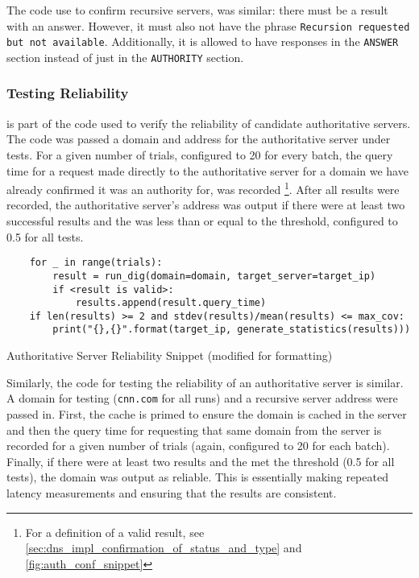 The code use to confirm recursive servers, was similar: there must be a result with an answer. However, it must also not have the phrase \texttt{Recursion requested but not available}. Additionally, it is allowed to have responses in the \texttt{ANSWER} section instead of just in the \texttt{AUTHORITY} section.

\subsubsection{Testing Reliability}

 is part of the code used to verify the reliability of candidate authoritative servers. The code was passed a domain and \ip address for the authoritative server under tests. For a given number of trials, configured to 20 for every batch, the query time for a request made directly to the authoritative server for a domain we have already confirmed it was an authority for, was recorded \footnote{For a definition of a valid result, see \cref{sec:dns_impl_confirmation_of_status_and_type} and \cref{fig:auth_conf_snippet}}. After all results were recorded, the authoritative server's \ip address was output if there were at least two successful results and the \cv was less than or equal to the threshold, configured to 0.5 for all tests.

\begin{code}[htb]
\centering
    \begin{verbatim}
    for _ in range(trials):
        result = run_dig(domain=domain, target_server=target_ip)
        if <result is valid>:
            results.append(result.query_time)
    if len(results) >= 2 and stdev(results)/mean(results) <= max_cov:
        print("{},{}".format(target_ip, generate_statistics(results)))
    \end{verbatim}
    \caption{Authoritative Server Reliability Snippet (modified for formatting)}
    \label{fig:auth_reliability_snippet}
\end{code}

Similarly, the code for testing the reliability of an authoritative server is similar. A domain for testing (\texttt{cnn.com} for all runs) and a recursive server \ip address were passed in. First, the cache is primed to ensure the domain is cached in the server and then the query time for requesting that same domain from the server is recorded for a given number of trials (again, configured to 20 for each batch). Finally, if there were at least two results and the \cv met the threshold (0.5 for all tests), the domain was output as reliable. This is essentially making repeated latency measurements and ensuring that the results are consistent.

